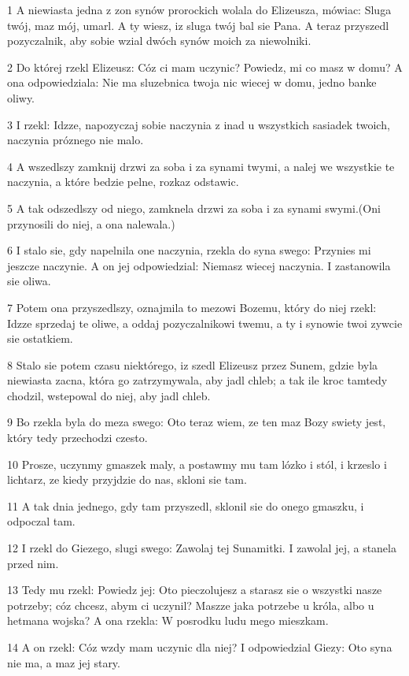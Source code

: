 \par 1 A niewiasta jedna z zon synów prorockich wolala do Elizeusza, mówiac: Sluga twój, maz mój, umarl. A ty wiesz, iz sluga twój bal sie Pana. A teraz przyszedl pozyczalnik, aby sobie wzial dwóch synów moich za niewolniki.
\par 2 Do której rzekl Elizeusz: Cóz ci mam uczynic? Powiedz, mi co masz w domu? A ona odpowiedziala: Nie ma sluzebnica twoja nic wiecej w domu, jedno banke oliwy.
\par 3 I rzekl: Idzze, napozyczaj sobie naczynia z inad u wszystkich sasiadek twoich, naczynia próznego nie malo.
\par 4 A wszedlszy zamknij drzwi za soba i za synami twymi, a nalej we wszystkie te naczynia, a które bedzie pelne, rozkaz odstawic.
\par 5 A tak odszedlszy od niego, zamknela drzwi za soba i za synami swymi.(Oni przynosili do niej, a ona nalewala.)
\par 6 I stalo sie, gdy napelnila one naczynia, rzekla do syna swego: Przynies mi jeszcze naczynie. A on jej odpowiedzial: Niemasz wiecej naczynia. I zastanowila sie oliwa.
\par 7 Potem ona przyszedlszy, oznajmila to mezowi Bozemu, który do niej rzekl: Idzze sprzedaj te oliwe, a oddaj pozyczalnikowi twemu, a ty i synowie twoi zywcie sie ostatkiem.
\par 8 Stalo sie potem czasu niektórego, iz szedl Elizeusz przez Sunem, gdzie byla niewiasta zacna, która go zatrzymywala, aby jadl chleb; a tak ile kroc tamtedy chodzil, wstepowal do niej, aby jadl chleb.
\par 9 Bo rzekla byla do meza swego: Oto teraz wiem, ze ten maz Bozy swiety jest, który tedy przechodzi czesto.
\par 10 Prosze, uczynmy gmaszek maly, a postawmy mu tam lózko i stól, i krzeslo i lichtarz, ze kiedy przyjdzie do nas, skloni sie tam.
\par 11 A tak dnia jednego, gdy tam przyszedl, sklonil sie do onego gmaszku, i odpoczal tam.
\par 12 I rzekl do Giezego, slugi swego: Zawolaj tej Sunamitki. I zawolal jej, a stanela przed nim.
\par 13 Tedy mu rzekl: Powiedz jej: Oto pieczolujesz a starasz sie o wszystki nasze potrzeby; cóz chcesz, abym ci uczynil? Maszze jaka potrzebe u króla, albo u hetmana wojska? A ona rzekla: W posrodku ludu mego mieszkam.
\par 14 A on rzekl: Cóz wzdy mam uczynic dla niej? I odpowiedzial Giezy: Oto syna nie ma, a maz jej stary.
